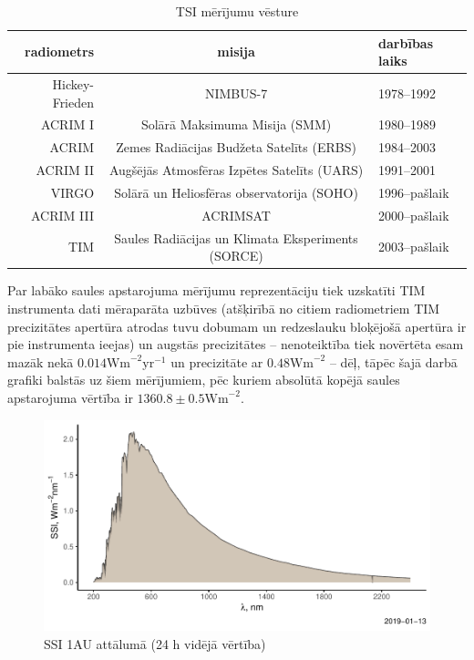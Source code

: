 \begin{table}[h]
    \caption{TSI mērījumu vēsture} %
    \begin{center}
    \begin{tabular}{| r | c | l |}
    \hline
    radiometrs & misija & darbības laiks \\ \hline
    Hickey-Frieden & NIMBUS-7 & 1978--1992  \\ \hline
	ACRIM I & Solārā Maksimuma Misija (SMM) & 1980--1989 \\ \hline
	ACRIM  & Zemes Radiācijas Budžeta Satelīts (ERBS) & 1984--2003 \\ \hline
	ACRIM II & Augšējās Atmosfēras Izpētes Satelīts (UARS) & 1991--2001 \\ \hline
	VIRGO & Solārā un Heliosfēras observatorija (SOHO)& 1996--pašlaik \\ \hline
	ACRIM III & ACRIMSAT  & 2000--pašlaik \\ \hline
	TIM & Saules Radiācijas un Klimata Eksperiments (SORCE) & 2003--pašlaik\\ \hline
    \end{tabular}
    \end{center}
    \label{tab:radiometers}
\end{table}

Par labāko saules apstarojuma mērījumu reprezentāciju tiek uzskatīti TIM instrumenta dati mēraparāta uzbūves (atšķirībā no citiem radiometriem TIM precizitātes apertūra atrodas tuvu dobumam un redzeslauku bloķējošā apertūra ir pie instrumenta ieejas) un augstās precizitātes -- nenoteiktība tiek novērtēta esam mazāk nekā $0.014\textrm{Wm}^{-2}\textrm{yr}^{-1}$ un precizitāte ar $0.48\textrm{Wm}^{-2}$ \cite{TSIdata} -- dēļ, tāpēc šajā darbā grafiki balstās uz šiem mērījumiem, pēc kuriem absolūtā kopējā saules apstarojuma vērtība ir $1360.8 \pm 0.5 \textrm{Wm}^{-2}$.\cite{Frohlich2012}

\begin{figure}[h]
    \centering
    \includegraphics[width=\linewidth]{figures/misc/SSI.pdf}
    \caption{SSI 1AU attālumā (24 h vidējā vērtība) \cite{SSIdata}}
    \label{fig:SSI}
\end{figure}

